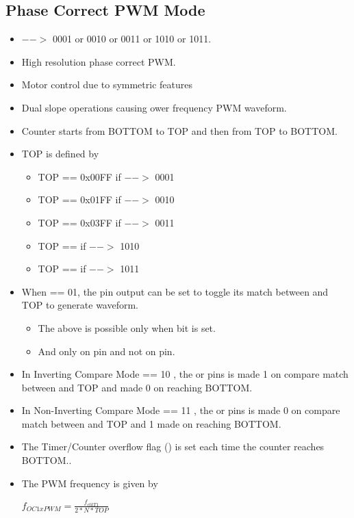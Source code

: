 \subsection{Phase Correct PWM Mode}
\begin{itemize}
    \item {} $-->$ 0001 or 0010 or 0011 or 1010 or 1011.    
    \item High resolution phase correct PWM.
    \item Motor control due to symmetric features
    \item Dual slope operations causing ower frequency PWM waveform.
    \item Counter starts from BOTTOM to TOP and then from TOP to BOTTOM.
    \item TOP is defined by
    \begin{itemize}
        \item TOP == 0x00FF if  $-->$ 0001
        \item TOP == 0x01FF if  $-->$ 0010
        \item TOP == 0x03FF if  $-->$ 0011
        \item TOP ==    if  $-->$ 1010
        \item TOP ==   if  $-->$ 1011
    \end{itemize}
    \item  When  == 01, the  pin output can be set to toggle its match between  and TOP to generate waveform.
    \begin{itemize}
        \item The above is possible only when  bit is set.
        \item And only on  pin and not on  pin.
    \end{itemize}
    \item In Inverting Compare Mode  == 10 , the  or  pins is made 1 on compare match between  and TOP and made 0 on reaching BOTTOM.
    \item In Non-Inverting Compare Mode  == 11 , the  or  pins is made 0 on compare match between  and TOP and 1 made  on reaching BOTTOM.
    \item The Timer/Counter overflow flag () is set each time the counter reaches BOTTOM..
    \item The PWM frequency is given by 
    \begin{center}
        { \Large $f_{OC1xPWM} = \frac{f_{clkT1}}{2 * N * TOP}$ }
    \end{center}
\end{itemize}


